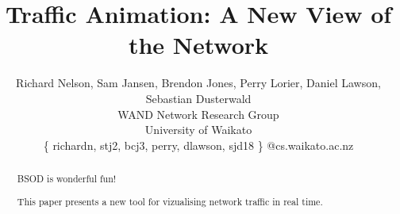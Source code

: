 \documentclass[twocolumn,10pt]{article}
\begin{document}
 

\title{\Large \bf Traffic Animation: A New View of the Network}

\author{\rm Richard Nelson, Sam Jansen, Brendon Jones, Perry Lorier, Daniel Lawson, Sebastian Dusterwald \\
WAND Network Research Group\\
University of Waikato\\
\{ richardn, stj2, bcj3, perry, dlawson, sjd18 \} @cs.waikato.ac.nz }
\date{}

\maketitle

\begin{abstract}
BSOD is wonderful fun!

This paper presents a new tool for vizualising network traffic in real time.

\end{abstract}













\end{document}
